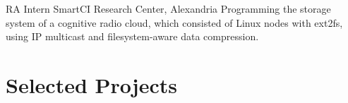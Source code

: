 \documentclass[letterpaper]{twentysecondcv} %
\begin{document}
\begin{twenty}
               {RA Intern}
               {SmartCI Research Center, Alexandria}
               {Programming the storage system of a cognitive radio cloud, which consisted of
                Linux nodes with ext2fs, using IP multicast and filesystem-aware data compression.}

\end{twenty}


\section{Selected Projects}
\end{document}
